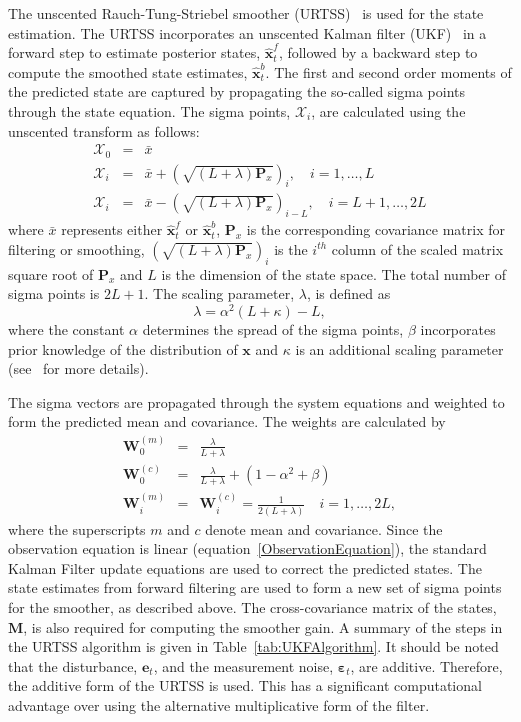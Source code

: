 \documentclass[12pt]{iopart}
\begin{document}
The unscented Rauch-Tung-Striebel smoother (URTSS)~\cite{Sarkka2010} is used for the state estimation. The URTSS incorporates an unscented Kalman filter (UKF)~\cite{Julier1997, Merwe2003} in a forward step to estimate posterior states, $\hat{\mathbf x}_t^{f}$, followed by a backward step to compute the smoothed state estimates, $\hat{\mathbf x}_t^{b}$. The first and second order moments of the predicted state are captured by propagating the so-called sigma points through the state equation. The sigma points, $\mathcal X_i$, are calculated using the unscented transform as follows:
\begin{eqnarray}\label{eq:sigmapoints1}
	\mathcal X_{0}&=&\bar x \\
	\mathcal X_{i}&=&\bar x+\left(\sqrt{( L + \lambda)\mathbf P_x}\right)_i, \quad i=1, \dots, L \\
	\mathcal X_{i}&=&\bar x-\left(\sqrt{( L + \lambda)\mathbf P_x}\right)_{i- L}, \quad i= L+1, \dots, 2L 
\end{eqnarray}
where $\bar x$ represents either $\hat{\mathbf x}_t^{f}$ or $\hat{\mathbf x}_t^{b}$, $\mathbf{P}_x$ is the corresponding covariance matrix for filtering or smoothing, $\left(\sqrt{( L + \lambda)\mathbf P_x}\right)_i$ is the $i^{th}$ column of the scaled matrix square root of $\mathbf P_x$ and $L$ is the dimension of the state space. The total number of sigma points is $2L+1$. The scaling parameter, $\lambda$, is defined as 
\begin{equation}\label{eq:sigmapoints3}
	\lambda=\alpha^2( L+\kappa) - L, 
\end{equation}
where the constant $\alpha$ determines the spread of the sigma points, $\beta$ incorporates prior knowledge of the distribution of $\mathbf{x}$ and $\kappa$ is an additional scaling parameter (see~\cite{Haykin2001} for more details). 

The sigma vectors are propagated through the system equations and weighted to form the predicted mean and covariance. The weights are calculated by 
\begin{eqnarray}
	\mathbf W_0^{(m)}&=&\frac{\lambda}{ L+\lambda} \\
	\mathbf W_0^{(c)}&=&\frac{\lambda}{ L+\lambda}+(1-\alpha^2+\beta) \\
	\mathbf W_i^{(m)}&=&\mathbf W_i^{(c)}=\frac{1}{2( L+\lambda)} \quad i=1, \dots, 2L, 
\end{eqnarray}
where the superscripts $m$ and $c$ denote mean and covariance. Since the observation equation is linear (equation~\ref{ObservationEquation}), the standard Kalman Filter update equations are used to correct the predicted states. The state estimates from forward filtering are used to form a new set of sigma points for the smoother, as described above. The cross-covariance matrix of the states, $\mathbf M$, is also required for computing the smoother gain. A summary of the steps in the URTSS algorithm is given in Table~\ref{tab:UKFAlgorithm}. It should be noted that the disturbance, $\mathbf{e}_t$, and the measurement noise, $\boldsymbol{\varepsilon}_t$, are additive. Therefore, the additive form of the URTSS is used. This has a significant computational advantage over using the alternative multiplicative form of the filter. 
\end{document}
